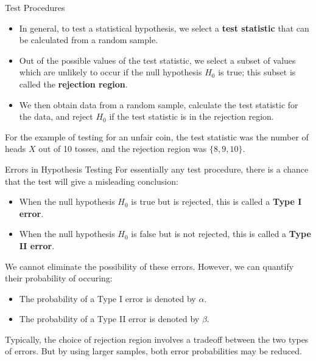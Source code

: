 \documentclass{beamer}
\renewcommand{\emph}{\textbf}
\begin{document}
\begin{frame}{Test Procedures}
\begin{itemize}
\item In general, to test a statistical hypothesis, we select a \emph{test statistic} that can be calculated from a random sample. 

\pause \item Out of the possible values of the test statistic, we select a subset of values which are unlikely to occur if the null hypothesis $H_0$ is true; this subset is called the \emph{rejection region}. 

\pause\item We then obtain data from a random sample, calculate the test statistic for the data, and reject $H_0$ if the test statistic is in the rejection region.
\end{itemize}

\pause For the example of testing for an unfair coin, the test statistic was the number of heads $X$ out of 10 tosses, and the rejection region was $\{8,9,10\}$.
\end{frame}

\begin{frame}{Errors in Hypothesis Testing}
For essentially any test procedure, there is a chance that the test will give a misleading conclusion:
\begin{itemize}
\pause\item When the null hypothesis $H_0$ is true but is rejected, this is called a \emph{Type I error}.
\pause\item When the null hypothesis $H_0$ is false but is not rejected, this is called a \emph{Type II error}.
\end{itemize}
\pause We cannot eliminate the possibility of these errors. However, we can quantify their probability of occuring:
\begin{itemize}
\pause\item The probability of a Type I error is denoted by $\alpha$.
\pause\item The probability of a Type II error is denoted by $\beta$.
\end{itemize}
\pause Typically, the choice of rejection region involves a tradeoff between the two types of errors. \pause But by using larger samples, both error probabilities may be reduced.
\end{frame}
\end{document}
